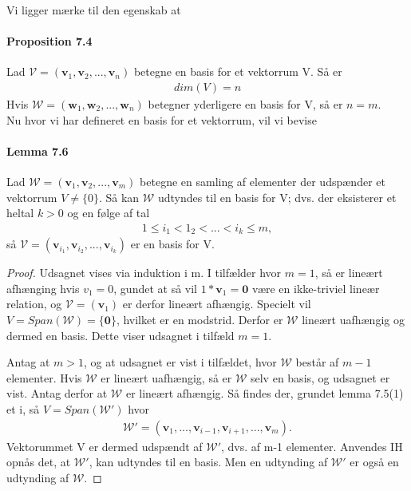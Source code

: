 \documentclass[paper=a4, fontsize=11pt]{scrartcl} %
\begin{document}
	Vi ligger mærke til den egenskab at
	
	\paragraph{Proposition 7.4} Lad $\mathcal{V}=(\mathbf{v}_1,\mathbf{v}_2,...,\mathbf{v}_n)$ betegne en basis for et vektorrum V. Så er 
	\begin{align*}
	dim(V)=n
	\end{align*}
	Hvis $\mathcal{W}=(\mathbf{w}_1,\mathbf{w}_2,...,\mathbf{w}_n)$ betegner yderligere en basis for V, så er $n=m$.\\
	
	Nu hvor vi har defineret en basis for et vektorrum, vil vi bevise 
	
	\paragraph{Lemma 7.6} Lad $\mathcal{W}=(\mathbf{v}_1,\mathbf{v}_2,...,\mathbf{v}_m)$ betegne en samling af elementer der udspænder et vektorrum $V\neq \{0\}$. Så kan $\mathcal{W}$ udtyndes til en basis for V; dvs. der eksisterer et heltal $k>0$ og en følge af tal
	\begin{align*}
	1\leq i_1 < 1_2 < ... < i_k \leq m,
	\end{align*}
	så $\mathcal{V}=(\mathbf{v}_{i_1},\mathbf{v}_{i_2},...,\mathbf{v}_{i_k})$ er en basis for V.
	\begin{proof}
		Udsagnet vises via induktion i m. I tilfælder hvor $m=1$, så er lineært afhænging hvis $v_1=0$, gundet at så vil $1*\mathbf{v}_1=\mathbf{0}$ være en ikke-triviel lineær relation, og $\mathcal{V}=(\mathbf{v}_1)$ er derfor lineært afhængig. Specielt vil $V=Span(\mathcal{W})=\{\mathbf{0}\}$, hvilket er en modstrid. Derfor er $\mathcal{W}$ lineært uafhængig og dermed en basis. Dette viser udsagnet i tilfæld $m=1$.	
		
		Antag at $m>1$, og at udsagnet er vist i tilfældet, hvor $\mathcal{W}$ består af $m-1$ elementer. Hvis $\mathcal{W}$ er lineært uafhængig, så er $\mathcal{W}$ selv en basis, og udsagnet er vist. Antag derfor at $\mathcal{W}$ er lineært afhængig. Så findes der, grundet lemma 7.5(1) et i, så $V=Span(\mathcal{W}')$ hvor
		\begin{align*}
		\mathcal{W}'=(\mathbf{v}_1,...,\mathbf{v}_{i-1},\mathbf{v}_{i+1},...,\mathbf{v}_m).
		\end{align*}
		Vektorummet V er dermed udspændt af $\mathcal{W}'$, dvs. af m-1 elementer. Anvendes IH opnås det, at $\mathcal{W}'$, kan udtyndes til en basis. Men en udtynding af $\mathcal{W}'$ er også en udtynding af $\mathcal{W}$.
	\end{proof}
	
\end{document}
